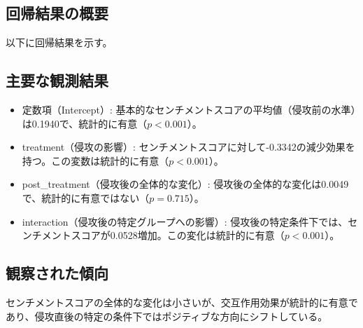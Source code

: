 \documentclass[11pt, a4j]{jreport}
\begin{document}
    \subsection*{回帰結果の概要}
    以下に回帰結果を示す。

    \begin{table}[H]
    \centering
    \caption{WLS Regression Results for Sentiment Score}
    \label{tab:wls_results}
    \end{table}

    \subsection*{主要な観測結果}
    \begin{itemize}
        \item 定数項（Intercept）: 基本的なセンチメントスコアの平均値（侵攻前の水準）は0.1940で、統計的に有意（$p < 0.001$）。
        \item treatment（侵攻の影響）: センチメントスコアに対して-0.3342の減少効果を持つ。この変数は統計的に有意（$p < 0.001$）。
        \item post\_treatment（侵攻後の全体的な変化）: 侵攻後の全体的な変化は0.0049で、統計的に有意ではない（$p = 0.715$）。
        \item interaction（侵攻後の特定グループへの影響）: 侵攻後の特定条件下では、センチメントスコアが0.0528増加。この変化は統計的に有意（$p < 0.001$）。
    \end{itemize}

    \subsection*{観察された傾向}
    センチメントスコアの全体的な変化は小さいが、交互作用効果が統計的に有意であり、侵攻直後の特定の条件下ではポジティブな方向にシフトしている。
\end{document}
